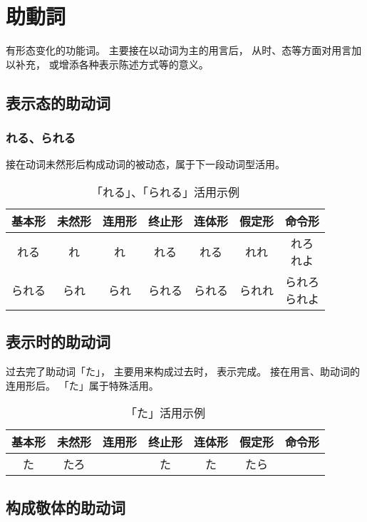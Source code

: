\section{助動詞}%

有形态变化的功能词。
主要接在以动词为主的用言后，
从时、态等方面对用言加以补充，
或增添各种表示陈述方式等的意义。

\subsection{表示态的助动词}%

\subsubsection{れる、られる}%

接在动词未然形后构成动词的被动态，属于下一段动词型活用。

\begin{table}[h]
  \centering
  \caption{「れる」、「られる」活用示例}
  \begin{tabular}{c c c c c c c}
    基本形 & 未然形 & 连用形 & 终止形 & 连体形 & 假定形 & 命令形 \\
    \hline
    れる & れ & れ & れる & れる & れれ & \makecell{れろ \\ れよ} \\
    られる & られ & られ & られる & られる & られれ & \makecell{られろ \\ られよ} \\
  \end{tabular}
\end{table}

\subsection{表示时的助动词}

过去完了助动词「た」，
主要用来构成过去时，
表示完成。
接在用言、助动词的连用形后。
「た」属于特殊活用。

\begin{table}[h]
  \centering
  \caption{「た」活用示例}
  \begin{tabular}{c c c c c c c}
    基本形 & 未然形 & 连用形 & 终止形 & 连体形 & 假定形 & 命令形 \\
    \hline
    た & たろ & & た & た & たら & \\
  \end{tabular}
\end{table}


\subsection{构成敬体的助动词}%

